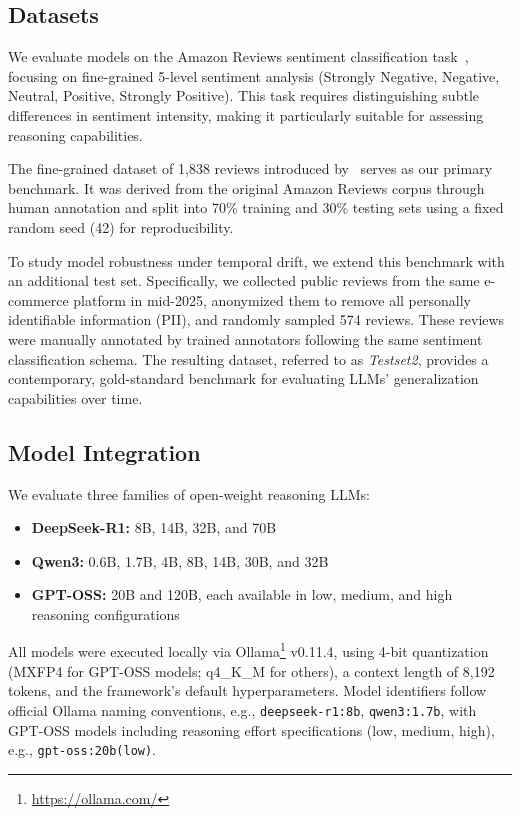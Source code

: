 \documentclass[conference]{IEEEtran}
\newcommand{\deepseekr}[1]{\texttt{deepseek-r1:#1}}
\newcommand{\qwenthree}[1]{\texttt{qwen3:#1}}
\newcommand{\gptoss}[2]{\texttt{gpt-oss:#1(#2)}}
\begin{document}
\subsection{Datasets}
\label{sec:datasets}

We evaluate models on the Amazon Reviews sentiment classification task~\cite{mcauley2013hidden}, focusing on fine-grained 5-level sentiment analysis (Strongly Negative, Negative, Neutral, Positive, Strongly Positive). This task requires distinguishing subtle differences in sentiment intensity, making it particularly suitable for assessing reasoning capabilities. 

The fine-grained dataset of 1,838 reviews introduced by~\cite{huang2025explainable} serves as our primary benchmark. It was derived from the original Amazon Reviews corpus through human annotation and split into 70\% training and 30\% testing sets using a fixed random seed (42) for reproducibility. 

To study model robustness under temporal drift, we extend this benchmark with an additional test set. Specifically, we collected public reviews from the same e-commerce platform in mid-2025, anonymized them to remove all personally identifiable information (PII), and randomly sampled 574 reviews. These reviews were manually annotated by trained annotators following the same sentiment classification schema. The resulting dataset, referred to as \textit{Testset2}, provides a contemporary, gold-standard benchmark for evaluating LLMs' generalization capabilities over time.

\subsection{Model Integration}

We evaluate three families of open-weight reasoning LLMs:  
\begin{itemize}[leftmargin=*,nosep]
    \item \textbf{DeepSeek-R1:} 8B, 14B, 32B, and 70B  
    \item \textbf{Qwen3:} 0.6B, 1.7B, 4B, 8B, 14B, 30B, and 32B  
    \item \textbf{GPT-OSS:} 20B and 120B, each available in low, medium, and high reasoning configurations  
\end{itemize}

All models were executed locally via Ollama\footnote{\url{https://ollama.com/}} v0.11.4, using 4-bit quantization (MXFP4 for GPT-OSS models; q4\_K\_M for others), a context length of 8{,}192 tokens, and the framework's default hyperparameters. Model identifiers follow official Ollama naming conventions, e.g., \deepseekr{8b}, \qwenthree{1.7b}, with GPT-OSS models including reasoning effort specifications (low, medium, high), e.g., \gptoss{20b}{low}.
\end{document}
